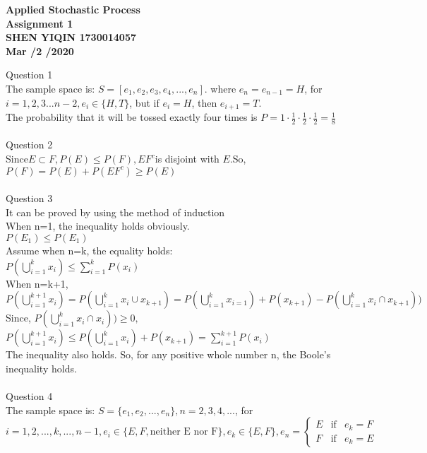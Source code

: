 \documentclass[12pt]{article}
\begin{document}
\begin{center}
\textbf{Applied Stochastic Process}
\\
\textbf{Assignment 1}
\\
\textbf{SHEN YIQIN  1730014057}
\\
\textbf{Mar /2 /2020}
\end{center}
\textrm{Question 1}
\\
\textrm{The sample space is:}  $S=[e_{1}, e_{2}, e_{3}, e_{4}, ... , e_{n} ].$
\textrm{where }$e_{n}=e_{n-1}=H${, for }$i=1,2,3...n-2, e_{i}\in\{H,T\}${, but if }$e_{i}=H$, {then} $e_{i+1}=T.$
\\
\textrm{The probability that it will be tossed exactly four times is }$P=1\cdot\frac{1}{2}\cdot\frac{1}{2}\cdot\frac{1}{2}=\frac{1}{8}$
\\
\\
\textrm{Question 2}
\\
\textrm{Since}$E\subset F,  P(E)\leq P(F), EF^{c}$\textrm{is disjoint with }$E.$\textrm{So,}$P(F)=P(E)+P(EF^{c})\geq P(E)$
\\
\\
\textrm{Question 3}
\\
\textrm{It can be proved by using the method of induction}
\\
\textrm{When n=1, the inequality holds obviously.}
\\
$P(E_{1})\leq P(E_{1})$
\\
\textrm{Assume when n=k, the equality holds:}
\\
$P(\bigcup^{k}_{i=1}x_{i})\leq\sum^{k}_{i=1}P(x_{i})$
\\
\textrm{When n=k+1,}
\\
$P(\bigcup^{k+1}_{i=1}x_{i})=P(\bigcup^{k}_{i=1}x_{i}\cup x_{k+1})=P(\bigcup^{k}_{i=1}x_{i=1})+P(x_{k+1})-P(\bigcup^{k}_{i=1}x_{i}\cap x_{k+1}))$
\\
\textrm{Since, }$P(\bigcup^{k}_{i=1}x_{i}\cap x_{i}))\geq0,$
\\
$P(\bigcup^{k+1}_{i=1}x_{i})\leq P(\bigcup^{k}_{i=1}x_{i})+P(x_{k+1})=\sum^{k+1}_{i=1}P(x_{i})$
\\
\textrm{The inequality also holds. So, for any positive whole number n, the Boole's inequality holds.}
\\
\\
\textrm{Question 4}
\\
\textrm{The sample space is:}  $S=\{e_{1}, e_{2}, ... ,e_{n}\}, n=2, 3, 4, ... ${, for }$i=1, 2,..., k,..., n-1,  e_{i}\in\{E, F, \mbox{neither E nor F}\}, e_{k}\in\{E, F\},  
e_{n}=\left\{
\begin{array}{rcl}
E & \mbox{if} & { e_{k}=F}\\
F & \mbox{if} & { e_{k}=E}
\end{array} \right.$
\end{document}
